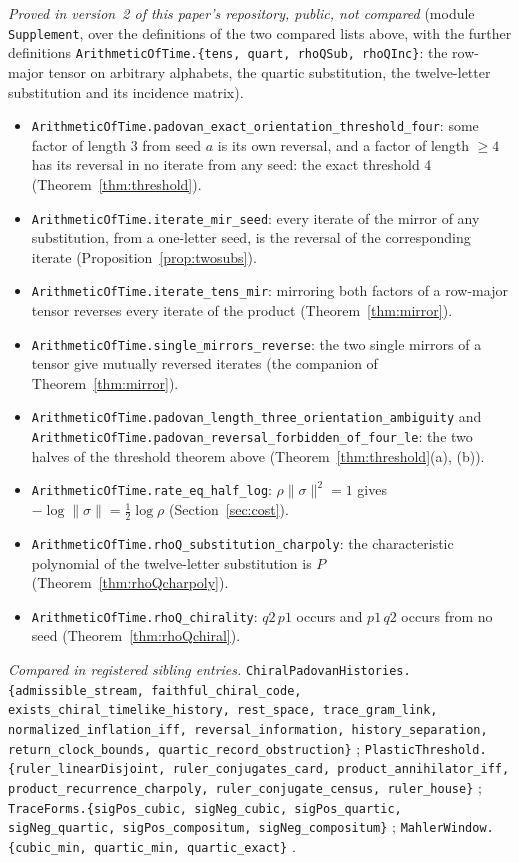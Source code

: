 \documentclass[11pt]{amsart}
\theoremstyle{plain}
\theoremstyle{definition}
\theoremstyle{remark}
\begin{document}
\emph{Proved in version~2 of this paper's repository, public, not compared} (module
\texttt{Supplement}, over the definitions of the two compared lists above, with the further
definitions \texttt{ArithmeticOfTime.\{tens, quart, rhoQSub, rhoQInc\}}: the row-major tensor on
arbitrary alphabets, the quartic substitution, the twelve-letter substitution and its incidence
matrix).
\begin{itemize}
\item \texttt{ArithmeticOfTime.padovan\_exact\_orientation\_threshold\_four}: some factor of
length $3$ from seed $a$ is its own reversal, and a factor of length $\ge 4$ has its reversal
in no iterate from any seed: the exact threshold $4$ (Theorem~\ref{thm:threshold}).
\item \texttt{ArithmeticOfTime.iterate\_mir\_seed}: every iterate of the mirror of any substitution,
from a one-letter seed, is the reversal of the corresponding iterate
(Proposition~\ref{prop:twosubs}).
\item \texttt{ArithmeticOfTime.iterate\_tens\_mir}: mirroring both factors of a row-major tensor
reverses every iterate of the product (Theorem~\ref{thm:mirror}).
\item \texttt{ArithmeticOfTime.single\_mirrors\_reverse}: the two single mirrors of a tensor give
mutually reversed iterates (the companion of Theorem~\ref{thm:mirror}).
\item \texttt{ArithmeticOfTime.padovan\_length\_three\_orientation\_ambiguity} and
\texttt{ArithmeticOfTime.padovan\_reversal\_forbidden\_of\_four\_le}: the two halves of the
threshold theorem above (Theorem~\ref{thm:threshold}(a), (b)).
\item \texttt{ArithmeticOfTime.rate\_eq\_half\_log}: $\rho \lVert \sigma \rVert^2 = 1$ gives
$-\log \lVert \sigma \rVert = \tfrac12 \log \rho$ (Section~\ref{sec:cost}).
\item \texttt{ArithmeticOfTime.rhoQ\_substitution\_charpoly}: the characteristic polynomial of the
twelve-letter substitution is $P$ (Theorem~\ref{thm:rhoQcharpoly}).
\item \texttt{ArithmeticOfTime.rhoQ\_chirality}: $q2\,p1$ occurs and $p1\,q2$ occurs from no seed
(Theorem~\ref{thm:rhoQchiral}).
\end{itemize}

\emph{Compared in registered sibling entries.}
\texttt{ChiralPadovanHistories.\{admissible\_stream, faithful\_chiral\_code,
exists\_chiral\_timelike\_history, rest\_space, trace\_gram\_link, normalized\_inflation\_iff,
reversal\_information, history\_separation, return\_clock\_bounds,
quartic\_record\_obstruction\}} \cite{palomar-cph};
\texttt{PlasticThreshold.\{ruler\_linearDisjoint, ruler\_conjugates\_card,
product\_annihilator\_iff, product\_recurrence\_charpoly, ruler\_conjugate\_census,
ruler\_house\}}
\cite{palomar-compositum};
\texttt{TraceForms.\{sigPos\_cubic, sigNeg\_cubic, sigPos\_quartic, sigNeg\_quartic,
sigPos\_compositum, sigNeg\_compositum\}} \cite{palomar-trace};
\texttt{MahlerWindow.\{cubic\_min, quartic\_min, quartic\_exact\}} \cite{palomar-mahler}.
\end{document}
